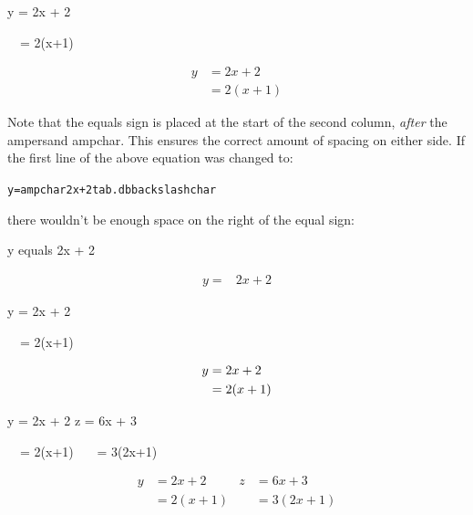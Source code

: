 \begin{code}
\newline
y = 2x + 2\newline
\strut~~= 2(x+1)\newline
{}
\end{code}
\begin{result}
\begin{align*}
y &= 2x + 2\\
  &= 2(x+1)
\end{align*}
\end{result}
Note that the equals sign is placed at the start of the second
column, \emph{after} the ampersand \gls{ampchar}. This ensures the
correct amount of spacing on either side. If the first line of the
above equation was changed to:\bookpagebreak
\begin{alltt}
\wrong y =\gls{ampchar} 2x + 2\gls{tab.dbbackslashchar}
\end{alltt}
there wouldn't be enough space on the right of the equal sign:
\begin{htmlresult}{y equals 2x + 2}
\begin{makeimage}
\begin{align*}
y =& 2x + 2
\end{align*}
\end{makeimage}
\end{htmlresult}


\begin{code}
\newline
y = 2x + 2\newline
\strut~~= 2(x+1)\newline
{}
\end{code}
\begin{result}
\begin{align}
y &= 2x + 2\notag\\
  &= 2(x+1)
\end{align}
\end{result}\screenpagebreak


\begin{code}
\newline
y = 2x + 2  z 
 = 6x + 3\newline
\strut~~= 2(x+1) ~~~= 3(2x+1)\newline
{}
\end{code}
\begin{result}
\begin{align*}
y &= 2x + 2 & z &= 6x + 3\\
  &= 2(x+1) &  &= 3(2x+1)
\end{align*}
\end{result}

